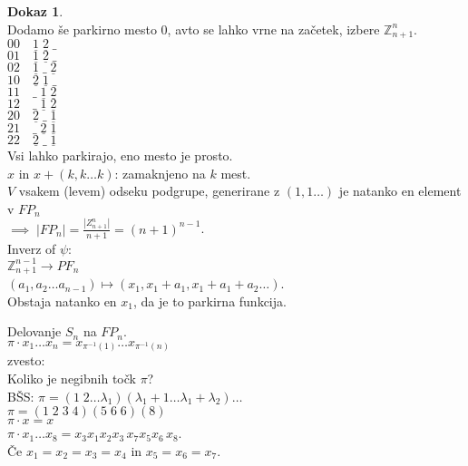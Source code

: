 \documentclass[a4paper, 12pt]{book}
\theoremstyle{definition}
\newtheorem{pro}[counter]{Dokaz}
\theoremstyle{remark}
\newcommand{\Z}{\mathbb{Z}}
\begin{document}
\begin{pro} \text{} \\
  Dodamo še parkirno mesto $0$, avto se lahko vrne na začetek, izbere $\Z_{n+1}^n$. \\
  $0 0 \quad \underline{1} \; \underline{2} \; \_$ \\
  $0 1 \quad \underline{1} \; \underline{2} \; \_$ \\
  $0 2 \quad \underline{1} \; \_ \; \underline{2}$ \\
  $1 0 \quad \underline{2} \; \underline{1} \; \_$ \\
  $1 1 \quad \_ \; \underline{1} \; \underline{2}$ \\
  $1 2 \quad \_ \; \underline{1} \; \underline{2}$ \\
  $2 0 \quad \underline{2} \; \_ \; \underline{1}$ \\
  $2 1 \quad \_ \; \underline{2} \; \underline{1}$ \\
  $2 2 \quad \underline{2} \; \_ \; \underline{1}$ \\
  Vsi lahko parkirajo, eno mesto je prosto. \\
  $x$ in $x + (k, k \dots k)$: zamaknjeno na $k$ mest. \\
  $V$ vsakem (levem) odseku podgrupe, generirane z $(1, 1 \dots )$ je natanko en element v $FP_n$ \\
  $\implies \; |FP_n| = \frac{\left|Z_{n+1}^n\right|}{n+1} = (n+1)^{n-1}$. \\
  Inverz of $\psi:$ \\
  $\Z_{n+1}^{n-1} \to PF_n$ \\
  $(a_1, a_2 \dots a_{n-1}) \mapsto (x_1, x_1+a_1, x_1+a_1+a_2 \dots)$. \\
  Obstaja natanko en $x_1$, da je to parkirna funkcija. 
\end{pro}
Delovanje $S_n$ na $FP_n$. \\
$\pi \cdot x_1 \dots x_n = x_{\pi^{-1}(1)} \dots x_{\pi^{-1}(n)}$ \\
zvesto: \checkmark \\
Koliko je negibnih točk $\pi$? \\
BŠS: $\pi = (1 \; 2 \dots \lambda_1) (\lambda_1 + 1 \dots \lambda_1 + \lambda_2) \dots$ \\
$\pi = (1 \; 2 \; 3 \; 4) (5 \; 6 \; 6) (8)$ \\
$\pi \cdot x = x$ \\
$\pi \cdot x_1 \dots x_8 = x_3 x_1 x_2 x_3 \, x_7 x_5 x_6 \, x_8$. \\
Če $x_1 = x_2 = x_3 = x_4$ in $x_5 = x_6 = x_7$. \\
\end{document}
